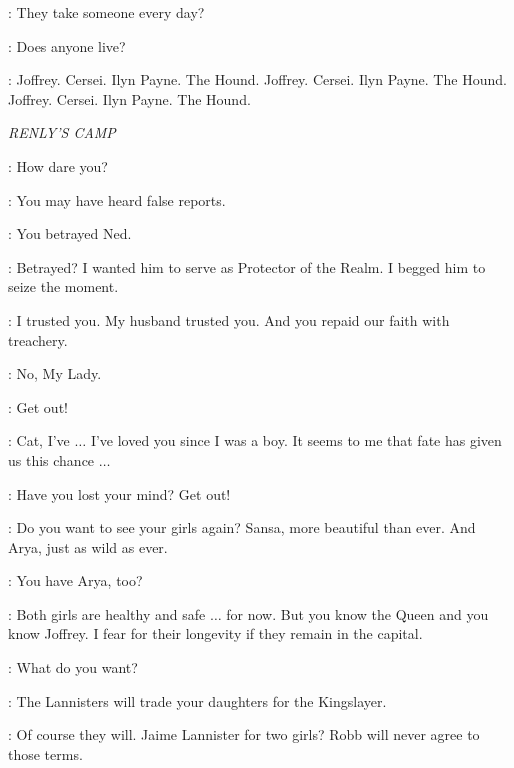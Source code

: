 \GENDRY: They take someone every day? 

\ARYA: Does anyone live? 



\ARYA: Joffrey. Cersei. Ilyn Payne. The Hound. Joffrey. Cersei. Ilyn Payne. The Hound. Joffrey. Cersei. Ilyn Payne. The Hound. 


\scene

\textit{RENLY'S CAMP} 


\CATELYN: How dare you? 

\LITTLEFINGER: You may have heard false reports. 

\CATELYN: You betrayed Ned. 

\LITTLEFINGER: Betrayed? I wanted him to serve as Protector of the Realm. I begged him to seize the moment. 

\CATELYN: I trusted you. My husband trusted you. And you repaid our faith with treachery. 

\LITTLEFINGER: No, My Lady. 

\CATELYN: Get out! 

\LITTLEFINGER: Cat, I've $\ldots$ I've loved you since I was a boy. It seems to me that fate has given us this chance $\ldots$  

\CATELYN: Have you lost your mind? Get out! 


\LITTLEFINGER: Do you want to see your girls again? Sansa, more beautiful than ever. And Arya, just as wild as ever. 

\CATELYN: You have Arya, too? 

\LITTLEFINGER: Both girls are healthy and safe $\ldots$ for now. But you know the Queen and you know Joffrey. I fear for their longevity if they remain in the capital. 


\CATELYN: What do you want? 

\LITTLEFINGER: The Lannisters will trade your daughters for the Kingslayer. 

\CATELYN: Of course they will. Jaime Lannister for two girls? Robb will never agree to those terms. 

